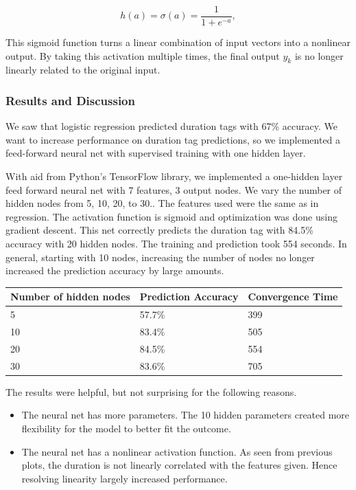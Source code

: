 \documentclass[]{article}
\begin{document}
\begin{equation*}
h(a) = \sigma(a)= \frac{1}{1+ e^{-a}},
\end{equation*}

This sigmoid function turns a linear combination of input vectors into a nonlinear output. By taking this activation multiple times, the final output $y_k$ is no longer linearly related to the original input.

\subsubsection{Results and Discussion}

We saw that logistic regression predicted duration tags with 67\% accuracy. We want to increase performance on duration tag predictions, so we implemented a feed-forward neural net with supervised training with one hidden layer.

With aid from Python's TensorFlow\cite{tensorflow} library, we implemented a one-hidden layer feed forward neural net with 7 features, 3 output nodes. We vary the number of hidden nodes from 5, 10, 20, to 30.. The features used were the same as in regression. The activation function is sigmoid and optimization was done using gradient descent. This net correctly predicts the duration tag with 84.5\% accuracy with 20 hidden nodes. The training and prediction took 554 seconds. In general, starting with 10 nodes, increasing the number of nodes no longer increased the prediction accuracy by large amounts.

\begin{center}
    \begin{tabular}{| l | l | l |}
    \hline
     Number of hidden nodes& Prediction Accuracy & Convergence Time\\ 
    \hline%
    5 & 57.7\% & 399\\ 
    10 & 83.4\% & 505\\ 
    20 & 84.5\% & 554\\
    30 & 83.6\% & 705 \\
     \hline
    \end{tabular}
\end{center}

The results were helpful, but not surprising for the following reasons.

\begin{itemize}
\item
The neural net has more parameters. The 10 hidden parameters created more flexibility for the model to better fit the outcome.
\item
The neural net has a nonlinear activation function. As seen from previous plots, the duration is not linearly correlated with the features given. Hence resolving linearity largely increased performance.
\end{itemize}
\end{document}
